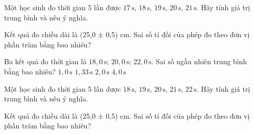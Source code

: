 
\begin{bt}
Một học sinh đo thời gian 5 lần được $17\,\text{s}$, $18\,\text{s}$, $19\,\text{s}$, $20\,\text{s}$, $21\,\text{s}$. Hãy tính giá trị trung bình và nêu ý nghĩa.
\end{bt}

\begin{ex}
Kết quả đo chiều dài là (25,0 ± 0,5) cm. Sai số tỉ đối của phép đo theo đơn vị phần trăm bằng bao nhiêu?
\end{ex}

\begin{ex}
Ba kết quả đo thời gian là $18,0\,\text{s}$; $20,0\,\text{s}$; $22,0\,\text{s}$. Sai số ngẫu nhiên trung bình bằng bao nhiêu?
\choice
{$1,0\,\text{s}$}
{\True $1,33\,\text{s}$}
{$2,0\,\text{s}$}
{$4,0\,\text{s}$}
\end{ex}


\begin{bt}
Một học sinh đo thời gian 5 lần được $18\,\text{s}$, $19\,\text{s}$, $20\,\text{s}$, $21\,\text{s}$, $22\,\text{s}$. Hãy tính giá trị trung bình và nêu ý nghĩa.
\end{bt}

\begin{ex}
Kết quả đo chiều dài là (25,0 ± 0,5) cm. Sai số tỉ đối của phép đo theo đơn vị phần trăm bằng bao nhiêu?
\end{ex}

